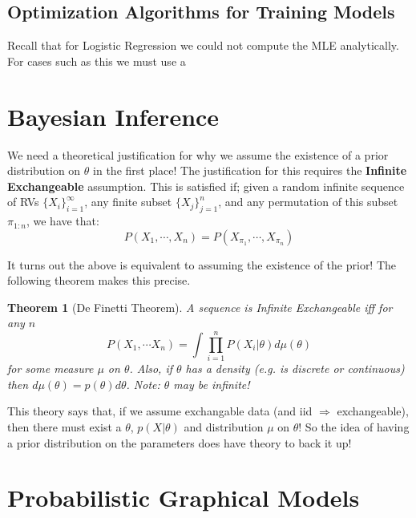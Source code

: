 \documentclass[]{article}
\theoremstyle{mattstyle}
\newtheorem{theorem}{Theorem}[section]
\theoremstyle{definition}
\begin{document}
\newpage

\subsection{Optimization Algorithms for Training Models}

Recall that for Logistic Regression we could not compute the MLE analytically. For cases such as this we must use a 

\newpage

\section{Bayesian Inference}
We need a theoretical justification for why we assume the existence of a prior distribution on \(\theta\) in the first place! The justification for this requires the \textbf{Infinite Exchangeable} assumption. This is satisfied if; given a random infinite sequence of RVs \( \{X_i\}_{i=1}^{\infty}\), any finite subset \(\{X_j\}_{j=1}^{n}\), and any permutation of this subset \(\pi_{1:n}\), we have that:
\begin{equation}
P(X_1, \cdots, X_n) = P(X_{\pi_1}, \cdots, X_{\pi_n})
\end{equation}

It turns out the above is equivalent to assuming the existence of the prior! The following theorem makes this precise.

\begin{theorem}[De Finetti Theorem]
	A sequence is Infinite Exchangeable iff for any \(n\)
	$$ P(X_1, \cdots X_n) = \int\prod_{i=1}^n P(X_i|\theta)d\mu(\theta) $$
	for some measure \(\mu\) on \(\theta\). Also, if $\theta$ has a density (e.g. is discrete or continuous) then $d\mu(\theta) = p(\theta)d\theta$. Note: \(\theta\) may be infinite!
\end{theorem}

This theory says that, if we assume exchangable data (and iid $\Rightarrow$ exchangeable), then there must exist a \(\theta\), \(p(X|\theta)\) and distribution \(\mu\) on \(\theta\)! So the idea of having a prior distribution on the parameters does have theory to back it up!

\newpage

\section{Probabilistic Graphical Models}
\end{document}
